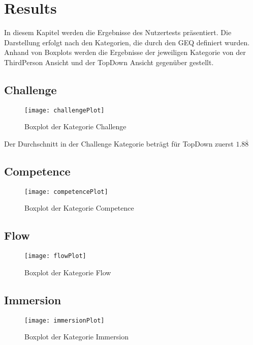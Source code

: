 \chapter{Results} %
In diesem Kapitel werden die Ergebnisse des Nutzertests präsentiert. Die Darstellung erfolgt nach den Kategorien, die durch den GEQ definiert wurden. Anhand von Boxplots werden die Ergebnisse der jeweiligen Kategorie von der ThirdPerson Ansicht und der TopDown Ansicht gegenüber gestellt.
\section{Challenge}
\begin{figure}[h!tb]
	\centering
	\texttt{[image: challengePlot]}
	\caption{Boxplot der Kategorie Challenge\label{fig:farbskala}}
\end{figure}
Der Durchschnitt in der Challenge Kategorie beträgt für TopDown zuerst $1.8\overline{8}$
\section{Competence}
\begin{figure}[h!tb]
	\centering
	\texttt{[image: competencePlot]}
	\caption{Boxplot der Kategorie Competence\label{fig:farbskala}}
\end{figure}

\section{Flow}
\begin{figure}[h!tb]
	\centering
	\texttt{[image: flowPlot]}
	\caption{Boxplot der Kategorie Flow\label{fig:farbskala}}
\end{figure}

\section{Immersion}
\begin{figure}[h!tb]
	\centering
	\texttt{[image: immersionPlot]}
	\caption{Boxplot der Kategorie Immersion\label{fig:farbskala}}
\end{figure}

